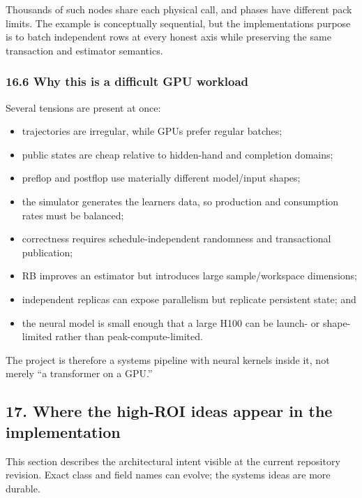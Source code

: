 \documentclass[
  10pt,
  letterpaper,
]{article}
\providecommand{\tightlist}{%
  \setlength{\itemsep}{0pt}\setlength{\parskip}{0pt}}
\begin{document}
Thousands of such nodes share each physical call, and phases have
different pack limits. The example is conceptually sequential, but the
implementation\textquotesingle s purpose is to batch independent rows at
every honest axis while preserving the same transaction and estimator
semantics.

\subsubsection{16.6 Why this is a difficult GPU
workload}\label{166-why-this-is-a-difficult-gpu-workload}

Several tensions are present at once:

\begin{itemize}
\tightlist
\item
  trajectories are irregular, while GPUs prefer regular batches;
\item
  public states are cheap relative to hidden-hand and completion
  domains;
\item
  preflop and postflop use materially different model/input shapes;
\item
  the simulator generates the learner\textquotesingle s data, so
  production and consumption rates must be balanced;
\item
  correctness requires schedule-independent randomness and transactional
  publication;
\item
  RB improves an estimator but introduces large sample/workspace
  dimensions;
\item
  independent replicas can expose parallelism but replicate persistent
  state; and
\item
  the neural model is small enough that a large H100 can be launch- or
  shape-limited rather than peak-compute-limited.
\end{itemize}

The project is therefore a systems pipeline with neural kernels inside
it, not merely ``a transformer on a GPU.''

\subsection{17. Where the high-ROI ideas appear in the
implementation}\label{17-where-the-high-roi-ideas-appear-in-the-implementation}

This section describes the architectural intent visible at the current
repository revision. Exact class and field names can evolve; the systems
ideas are more durable.
\end{document}
